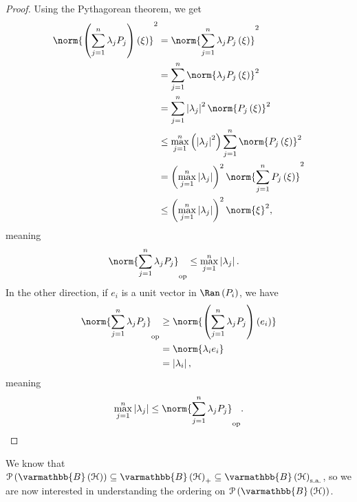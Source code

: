 \documentclass[10pt]{mypackage}
\renewcommand*{\mathbb}[1]{\varmathbb{#1}}
\newcommand{\sa}{\text{s.a.}}
\newcommand{\B}{\mathbb{B}}
\begin{document}
\begin{proof}
  Using the Pythagorean theorem, we get
  \begin{align*}
    \norm{\left(\sum_{j=1}^{n}\lambda_jP_j\right)\left(\xi\right)}^2 &= \norm{\sum_{j=1}^{n}\lambda_jP_j\left(\xi\right)}^2\\
                                                                     &= \sum_{j=1}^{n}\norm{\lambda_jP_j\left(\xi\right)}^2\\
                                                                     &= \sum_{j=1}^{n}\left\vert \lambda_j \right\vert^2\norm{P_j\left(\xi\right)}^2\\
                                                                     &\leq \max_{j=1}^{n}\left(\left\vert \lambda_j \right\vert^2\right)\sum_{j=1}^{n}\norm{P_j\left(\xi\right)}^2\\
                                                                     &= \left(\max_{j=1}^{n} \left\vert \lambda_j \right\vert\right)^2\norm{\sum_{j=1}^{n}P_j\left(\xi\right)}^2\\
                                                                     &\leq \left(\max_{j=1}^{n}\left\vert \lambda_j \right\vert\right)^2\norm{\xi}^2,
  \end{align*}
  meaning
  \begin{align*}
    \norm{\sum_{j=1}^{n}\lambda_jP_j}_{\text{op}} &\leq \max_{j=1}^{n}\left\vert \lambda_j \right\vert.
  \end{align*}
  In the other direction, if $e_i$ is a unit vector in $\Ran\left(P_i\right)$, we have
  \begin{align*}
    \norm{\sum_{j=1}^{n}\lambda_jP_j}_{\text{op}} &\geq \norm{\left(\sum_{j=1}^{n}\lambda_jP_j\right)\left(e_i\right)}\\
                                                  &= \norm{\lambda_ie_i}\\
                                                  &= \left\vert \lambda_i \right\vert,
  \end{align*}
  meaning
  \begin{align*}
    \max_{j=1}^{n}\left\vert \lambda_j \right\vert \leq \norm{\sum_{j=1}^{n}\lambda_jP_j}_{\text{op}}.
  \end{align*}
\end{proof}
We know that $\mathcal{P}\left(\B\left(\mathcal{H}\right)\right)\subseteq \B\left(\mathcal{H}\right)_{+}\subseteq \B\left(\mathcal{H}\right)_{\sa}$, so we are now interested in understanding the ordering on $\mathcal{P}\left(\B\left(\mathcal{H}\right)\right)$.
\end{document}
